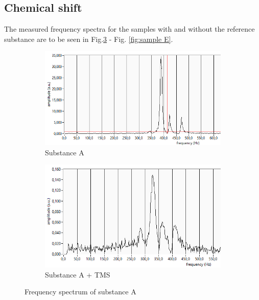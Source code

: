 \subsection{Chemical shift}
The measured frequency spectra for the samples with and without the reference substance are to be seen in Fig.\ref{fig:sample A} - Fig. \ref{fig:sample E}.
\begin{figure}[!htbp]
  \centering
  \begin{subfigure}[b]{0.47\textwidth}
    \centering
    \includegraphics[width=\textwidth]{./Latex images/A.png}
    \caption{Substance A}
    \label{fig: A}
  \end{subfigure}
  \hfill
  \begin{subfigure}[b]{0.47\textwidth}
    \centering
    \includegraphics[width=\textwidth]{./Latex images/Ap.png}
    \caption{Substance A + TMS}
    \label{fig: A + TMS}
  \end{subfigure}
  \caption{Frequency spectrum of substance A}
  \label{fig:sample A}
\end{figure}

